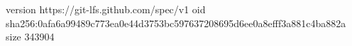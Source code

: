 version https://git-lfs.github.com/spec/v1
oid sha256:0afa6a99489c773ea0e44d3753bc597637208695d6ee0a8efff3a881c4ba882a
size 343904
